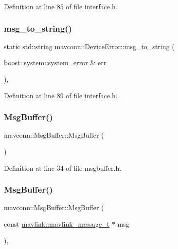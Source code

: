 Definition at line 85 of file interface.\+h.

\mbox{\label{group__mavconn_ga1a6103f0af6a0a451ae5af0ba190a50d}} 
\subsubsection{\texorpdfstring{msg\_to\_string()}{msg\_to\_string()}\hspace{0.1cm}{\footnotesize\ttfamily [3/3]}}
{\footnotesize\ttfamily static std\+::string mavconn\+::\+Device\+Error\+::msg\+\_\+to\+\_\+string (\begin{DoxyParamCaption}\item[{boost\+::system\+::system\+\_\+error \&}]{err }\end{DoxyParamCaption})\hspace{0.3cm}{\ttfamily [inline]}, {\ttfamily [static]}}



Definition at line 89 of file interface.\+h.

\mbox{\label{group__mavconn_ga64da82fdf707ca5304fda5e686fe4f11}} 
\subsubsection{\texorpdfstring{MsgBuffer()}{MsgBuffer()}\hspace{0.1cm}{\footnotesize\ttfamily [1/4]}}
{\footnotesize\ttfamily mavconn\+::\+Msg\+Buffer\+::\+Msg\+Buffer (\begin{DoxyParamCaption}{ }\end{DoxyParamCaption})\hspace{0.3cm}{\ttfamily [inline]}}



Definition at line 34 of file msgbuffer.\+h.

\mbox{\label{group__mavconn_ga202de878cea6b3fff8f8ef8c7f001cd5}} 
\subsubsection{\texorpdfstring{MsgBuffer()}{MsgBuffer()}\hspace{0.1cm}{\footnotesize\ttfamily [2/4]}}
{\footnotesize\ttfamily mavconn\+::\+Msg\+Buffer\+::\+Msg\+Buffer (\begin{DoxyParamCaption}\item[{const \mbox{\hyperlink{include__v0_89_2mavlink__types_8h_a63b963764c09dc72f4910c1521e325b9}{mavlink\+::mavlink\+\_\+message\+\_\+t}} $\ast$}]{msg }\end{DoxyParamCaption})\hspace{0.3cm}{\ttfamily [inline]}, {\ttfamily [explicit]}}



